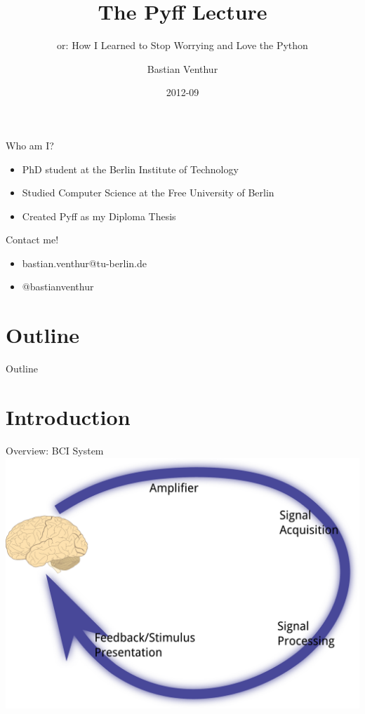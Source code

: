 \documentclass{beamer}
\title{The Pyff Lecture}
\subtitle{or: How I Learned to Stop Worrying and Love the Python}
\author{Bastian Venthur}
\institute{Berlin Institute of Technology}
\date{2012-09}
\begin{document}
\begin{frame}[plain]
    \titlepage
\end{frame}

\begin{frame}{Who am I?}
    \begin{itemize}
        \item PhD student at the Berlin Institute of Technology
        \item Studied Computer Science at the Free University of Berlin
        \item Created Pyff as my Diploma Thesis
    \end{itemize}
    \vfill
    \begin{box}{Contact me!}
        \begin{itemize}
            \item bastian.venthur@tu-berlin.de
            \item @bastianventhur
        \end{itemize}
    \end{box}
\end{frame}

\section*{Outline}
\begin{frame}{Outline}
    \tableofcontents[hidesubsections]
\end{frame}

\section{Introduction}
\begin{frame}{Overview: BCI System}
    \includegraphics[width=\linewidth]{bci_system}
\end{frame}
\end{document}
